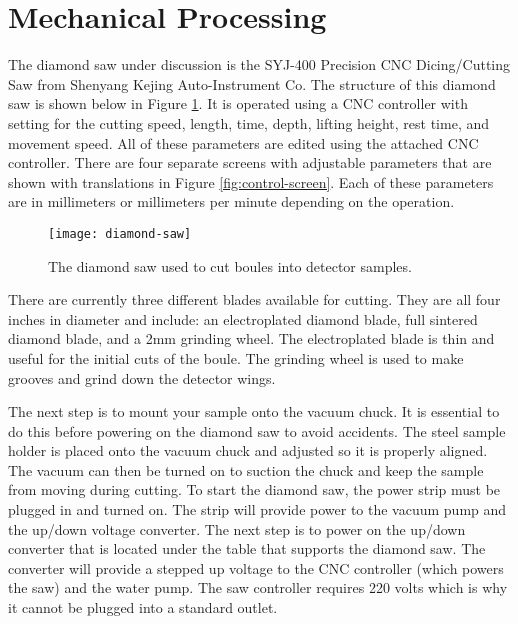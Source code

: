 \section{Mechanical Processing}
The diamond saw under discussion is the SYJ-400 Precision CNC Dicing/Cutting Saw from Shenyang Kejing Auto-Instrument Co.
The structure of this diamond saw is shown below in Figure \ref{fig:diamondsaw}.
It is operated using a CNC controller with setting for the cutting speed, length, time, depth, lifting height, rest time, and movement speed.
All of these parameters are edited using the attached CNC controller. 
There are four separate screens with adjustable parameters that are shown with translations in Figure \ref{fig:control-screen}. 
Each of these parameters are in millimeters or millimeters per minute depending on the operation.
\begin{figure}[htpb]
\centering
\texttt{[image: diamond-saw]}
\caption{The diamond saw used to cut boules into detector samples.}
\label{fig:diamondsaw}
\end{figure}

There are currently three different blades available for cutting.
They are all four inches in diameter and include: an electroplated diamond blade, full sintered diamond blade, and a 2mm grinding wheel.
The electroplated blade is thin and useful for the initial cuts of the boule.
The grinding wheel is used to make grooves and grind down the detector wings.

The next step is to mount your sample onto the vacuum chuck.
It is essential to do this before powering on the diamond saw to avoid accidents.
The steel sample holder is placed onto the vacuum chuck and adjusted so it is properly aligned.
The vacuum can then be turned on to suction the chuck and keep the sample from moving during cutting.
To start the diamond saw, the power strip must be plugged in and turned on.
The strip will provide power to the vacuum pump and the up/down voltage converter.
The next step is to power on the up/down converter that is located under the table that supports the diamond saw.
The converter will provide a stepped up voltage to the CNC controller (which powers the saw) and the water pump.
The saw controller requires 220 volts which is why it cannot be plugged into a standard outlet.

